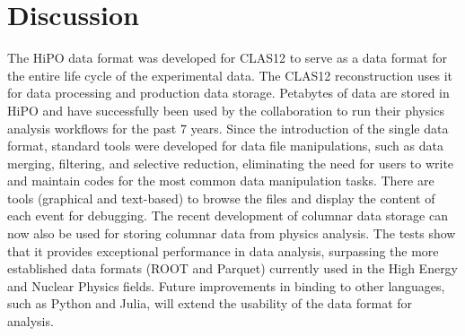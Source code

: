 \section{Discussion}

The HiPO data format was developed for CLAS12 to serve as a data format for the entire life cycle of the experimental data. The CLAS12 reconstruction uses it for data processing and production data storage. Petabytes of data are stored in HiPO and have successfully been used by the collaboration to run their physics analysis workflows for the past 7 years. Since the introduction of the single data format, standard tools were developed for data file manipulations, such as data merging, filtering, and selective reduction, eliminating the need for users to write and maintain codes for the most common data manipulation tasks. There are tools (graphical and text-based) to browse the files and display the content of each event for debugging.
The recent development of columnar data storage can now also be used for storing columnar data from physics analysis. The tests show that it provides exceptional performance in data analysis, surpassing the more established data formats (ROOT and Parquet) currently used in the High Energy and Nuclear Physics fields.
Future improvements in binding to other languages, such as Python and Julia, will extend the usability of the data format for analysis.



